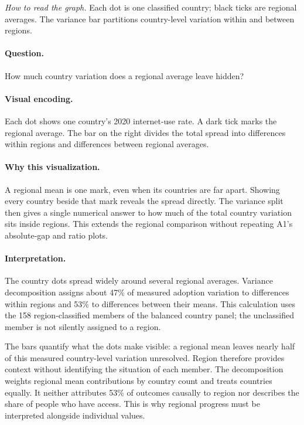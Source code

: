 \documentclass[conference,a4paper]{IEEEtran}
\begin{document}
\noindent\textit{How to read the graph.} Each dot is one classified country; black ticks are regional averages. The variance bar partitions country-level variation within and between regions.

\paragraph{Question.} How much country variation does a regional average leave hidden?



\paragraph{Visual encoding.} Each dot shows one country's 2020 internet-use rate. A dark tick marks the regional average. The bar on the right divides the total spread into differences within regions and differences between regional averages.



\paragraph{Why this visualization.} A regional mean is one mark, even when its countries are far apart. Showing every country beside that mark reveals the spread directly. The variance split then gives a single numerical answer to how much of the total country variation sits inside regions. This extends the regional comparison without repeating A1's absolute-gap and ratio plots.



\paragraph{Interpretation.} The country dots spread widely around several regional averages. Variance decomposition assigns about 47\% of measured adoption variation to differences within regions and 53\% to differences between their means. This calculation uses the 158 region-classified members of the balanced country panel; the unclassified member is not silently assigned to a region.

The bars quantify what the dots make visible: a regional mean leaves nearly half of this measured country-level variation unresolved. Region therefore provides context without identifying the situation of each member. The decomposition weights regional mean contributions by country count and treats countries equally. It neither attributes 53\% of outcomes causally to region nor describes the share of people who have access. This is why regional progress must be interpreted alongside individual values.
\end{document}
